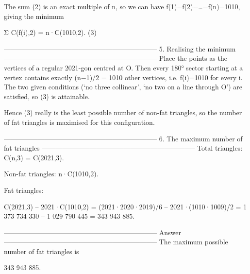 The sum (2) is an exact multiple of n, so we can have  
f(1)=f(2)=…=f(n)=1010, giving the minimum

Σ C(f(i),2) = n·C(1010,2).                   (3)

--------------------------------------------------------------------
5.  Realising the minimum
--------------------------------------------------------------------
Place the points as the vertices of a regular 2021-gon centred at O.
Then every 180° sector starting at a vertex contains
exactly (n−1)/2 = 1010 other vertices, i.e. f(i)=1010 for every i.
The two given conditions (‘no three collinear’, ‘no two on a line
through O’) are satisfied, so (3) is attainable.

Hence (3) really is the least possible number of non-fat triangles,
so the number of fat triangles is maximised for this configuration.

--------------------------------------------------------------------
6.  The maximum number of fat triangles
--------------------------------------------------------------------
Total triangles:        C(n,3) = C(2021,3).

Non-fat triangles:      n·C(1010,2).

Fat triangles:

C(2021,3) – 2021·C(1010,2)
 = (2021·2020·2019)/6  –  2021·(1010·1009)/2
 = 1 373 734 330       –   1 029 790 445
 = 343 943 885.

--------------------------------------------------------------------
Answer
--------------------------------------------------------------------
The maximum possible number of fat triangles is  

343 943 885.